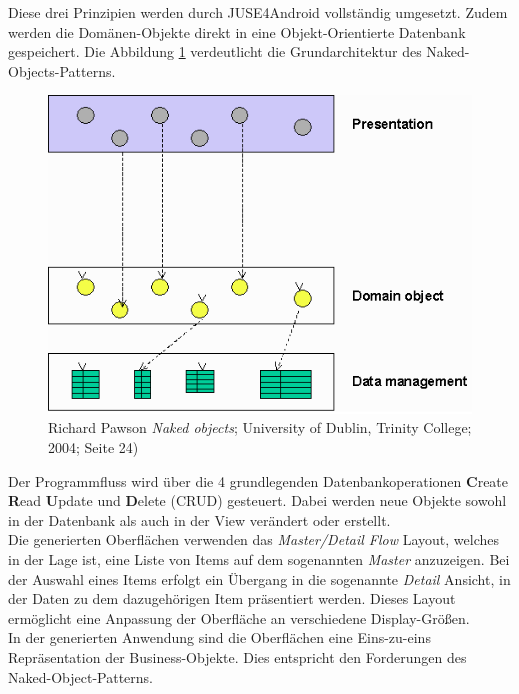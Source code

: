 \documentclass[a4paper,twoside]{article}
\begin{document}
Diese drei Prinzipien werden durch JUSE4Android vollständig umgesetzt. Zudem werden die Domänen-Objekte direkt in eine Objekt-Orientierte Datenbank gespeichert. Die Abbildung \ref{fig:Grafik3} verdeutlicht die Grundarchitektur des Naked-Objects-Patterns.\\
\begin{figure}[!h]
	\centering
	\includegraphics[scale=.5]{pics/NakedObjectPattern.png}
	\caption[Naked-Object-Pattern Architektur nach Richard Pawson, University of Dublin, Trinity College]{ Richard Pawson  \emph{\glqq Naked objects\grqq{}}; University of Dublin, Trinity College; 2004; Seite 24)}
	\label{fig:Grafik3}
\end{figure}

Der Programmfluss wird über die 4 grundlegenden Datenbankoperationen \textbf{C}reate \textbf{R}ead \textbf{U}pdate und \textbf{D}elete (CRUD) gesteuert. Dabei werden neue Objekte sowohl in der Datenbank als auch in der View verändert oder erstellt.\\ 
Die generierten Oberflächen verwenden das \textit{Master/Detail Flow} Layout, welches in der Lage ist, eine Liste von Items auf dem sogenannten \textit{Master} anzuzeigen. Bei der Auswahl eines Items erfolgt ein Übergang in die sogenannte \textit{Detail} Ansicht, in der Daten zu dem dazugehörigen Item präsentiert werden. Dieses Layout ermöglicht eine Anpassung der Oberfläche an verschiedene  Display-Größen.\\
In der generierten Anwendung sind die Oberflächen eine Eins-zu-eins Repräsentation der Business-Objekte. Dies entspricht den Forderungen des Naked-Object-Patterns.
\end{document}
